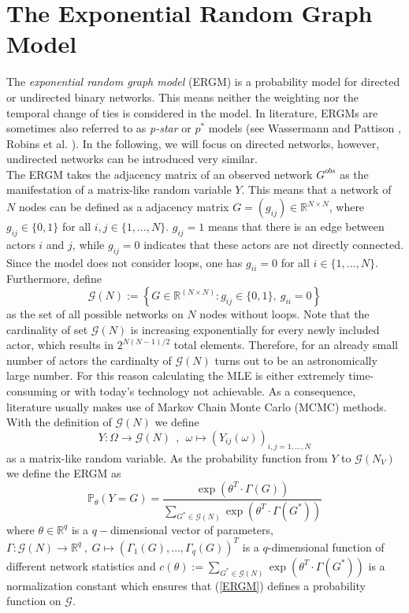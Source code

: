 \documentclass[headsepline=true, abstracton]{scrartcl}
\begin{document}
 \section*{The Exponential Random Graph Model}
The \textit{exponential random graph model} (ERGM) is a probability model for directed or undirected binary networks. This means neither the weighting nor the temporal change of ties is considered in the model.
In literature, ERGMs are sometimes also referred to as \textit{p-star} or $p^*$ models (see Wassermann and Pattison \cite{Wasserman.1996}, Robins et al. \cite{robins.pattison.2007}). In the following, we will focus on directed networks, however, undirected networks can be introduced very similar.\\[0.3cm] 
The ERGM takes the adjacency matrix of an observed network $G^{obs}$ as the manifestation of a matrix-like random variable $Y$. This means that a network of $N$ nodes can be defined as a adjacency matrix $G=(g_{ij})\in \mathbb{R}^{N \times N}$, where $g_{ij} \in \{0,1\}$ for all $i,j \in \{1,\dots , N\}$. $g_{ij}=1$ means that there is an edge between actors $i$ and $j$, while $g_{ij}=0$ indicates that these actors are not directly connected. Since the model does not consider loops, one has $g_{ii}=0$ for all $i \in \{1,\dots , N\}$. Furthermore, define
$$ \mathcal{G}(N) := \left\{ G \in \mathbb{R}^{(N \times N)}: g_{ij} \in \{0,1\},~g_{ii}=0\right\}$$
as the set of all possible networks on $N$ nodes without loops. Note that the cardinality of set $\mathcal{G}(N)$ is increasing exponentially for every newly included actor, which results in $2^{N(N-1)/2}$ total elements. Therefore, for an already small number of actors the cardinalty of $\mathcal{G}(N)$ turns out to be an astronomically large number. For this reason calculating the MLE is either extremely time-consuming or with today's technology not achievable. As a consequence, literature usually makes use of Markov Chain Monte Carlo (MCMC) methods.\\  
With the definition of $\mathcal{G}(N)$ we define 
$$Y: \Omega \to \mathcal{G}(N)~~,~~\omega \mapsto (Y_{ij}(\omega))_{i,j=1,\dots,N}$$
as a matrix-like random variable. As the probability function from $Y$ to $\mathcal{G}(N_V)$ we define the ERGM as
\begin{equation}
\mathbb{P}_{\theta}(Y=G)=\dfrac{\exp(\theta^T \cdot \Gamma(G))}{\sum_{G^* \in \mathcal{G}(N)} \exp(\theta^T \cdot \Gamma(G^*))} 
\label{ERGM}
\end{equation}
%
where $\theta \in \mathbb{R}^q$ is a $q-$dimensional vector of parameters, $\Gamma:\mathcal{G}(N) \to \mathbb{R}^q~,~G \mapsto (\Gamma_1(G),\dots,\Gamma_q(G))^T$ is a $q$-dimensional function of different network statistics and $c(\theta):= \sum_{G^* \in \mathcal{G}(N)} \exp(\theta^T \cdot \Gamma(G^*))$ is a normalization constant which ensures that (\ref{ERGM}) defines a probability function on $\mathcal{G}$.
\end{document}
